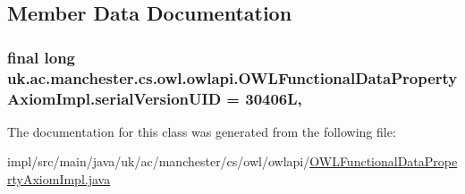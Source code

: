 \subsection{Member Data Documentation}
\hypertarget{classuk_1_1ac_1_1manchester_1_1cs_1_1owl_1_1owlapi_1_1_o_w_l_functional_data_property_axiom_impl_afefd2d8486c91af0d996a7caa06fc097}{
\subsubsection[{serial\-Version\-U\-I\-D}]{\setlength{\rightskip}{0pt plus 5cm}final long uk.\-ac.\-manchester.\-cs.\-owl.\-owlapi.\-O\-W\-L\-Functional\-Data\-Property\-Axiom\-Impl.\-serial\-Version\-U\-I\-D = 30406\-L\hspace{0.3cm}{\ttfamily [static]}, {\ttfamily [private]}}}\label{classuk_1_1ac_1_1manchester_1_1cs_1_1owl_1_1owlapi_1_1_o_w_l_functional_data_property_axiom_impl_afefd2d8486c91af0d996a7caa06fc097}


The documentation for this class was generated from the following file\-:\begin{DoxyCompactItemize}
\item 
impl/src/main/java/uk/ac/manchester/cs/owl/owlapi/\hyperlink{_o_w_l_functional_data_property_axiom_impl_8java}{O\-W\-L\-Functional\-Data\-Property\-Axiom\-Impl.\-java}\end{DoxyCompactItemize}

